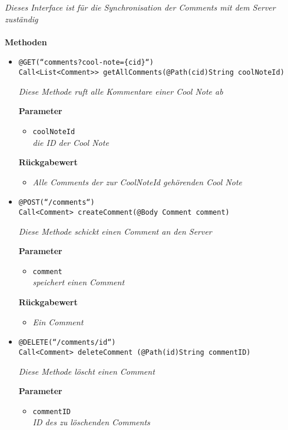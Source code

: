 		\textit{Dieses Interface ist für die Synchronisation der Comments mit dem Server zuständig}\\
\\
	\textbf{Methoden} 
		\begin{itemize}
		\item\texttt{{@GET(``comments?cool-note=\{cid\}``)\\ Call<List<Comment>> getAllComments(@Path(\grqq cid\grqq)String coolNoteId)}}

		\textit{Diese Methode ruft alle Kommentare einer Cool Note ab}

		\textbf{Parameter} 
		\begin{itemize}
			\item\texttt{coolNoteId}\\
		 	\textit{die ID der Cool Note}
	 	\end{itemize}

		\textbf{Rückgabewert} 
		\begin{itemize}
			\item\textit{Alle Comments der zur CoolNoteId gehörenden Cool Note}
	 	\end{itemize}


      \item\texttt{{@POST(``/comments``)
\\ Call<Comment> createComment(@Body Comment comment)}}

		\textit{Diese Methode schickt einen Comment an den Server }

		\textbf{Parameter} 
			\begin{itemize}
				\item\texttt{comment}\\
		 		\textit{speichert einen Comment}
	 		\end{itemize}


		\textbf{Rückgabewert} 
		\begin{itemize}
			\item\textit{Ein Comment}
	 	\end{itemize}
		

	 \item\texttt{{@DELETE(``/comments/{id}``)\\ Call<Comment> deleteComment (@Path(\grqq id\grqq)String commentID)}}

		\textit{Diese Methode löscht einen Comment }
		
		\textbf{Parameter} 
			\begin{itemize}
				\item\texttt{commentID}\\
		 		\textit{ID des zu löschenden Comments}
	 		\end{itemize}

	 \end{itemize}


